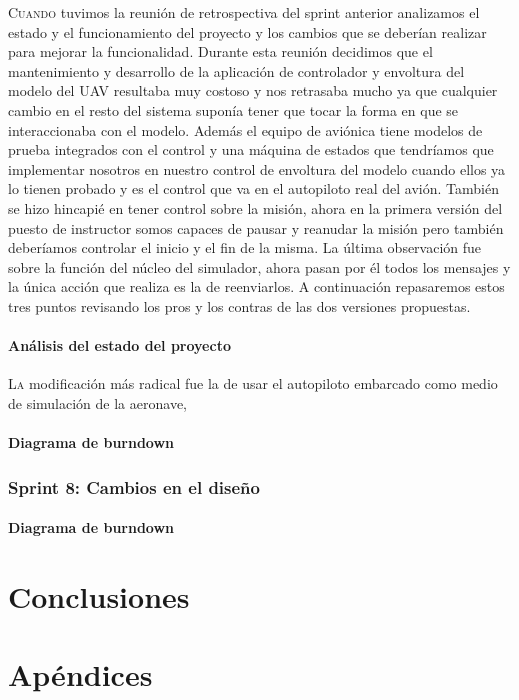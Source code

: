 \documentclass[12pt,a4paper,spanish]{book} %
\newcommand{\imgCentradaGrande}[3]{
\begin{figure}[H]
\begin{center}
\texttt{[image: \#2]}
\caption{#3}
\label{#1}
\end{center}
\end{figure}
}
\begin{document}
\lettrine{C}{uando} tuvimos la reunión de retrospectiva del sprint anterior analizamos el estado y el funcionamiento del proyecto y los cambios que se deberían realizar para mejorar la funcionalidad. Durante esta reunión decidimos que el mantenimiento y desarrollo de la aplicación de controlador y envoltura del modelo del UAV resultaba muy costoso y nos retrasaba mucho ya que cualquier cambio en el resto del sistema suponía tener que tocar la forma en que se interaccionaba con el modelo. Además el equipo de aviónica tiene modelos de prueba integrados con el control y una máquina de estados que tendríamos que implementar nosotros en nuestro control de envoltura del modelo cuando ellos ya lo tienen probado y es el control que va en el autopiloto real del avión. También se hizo hincapié en tener control sobre la misión, ahora en la primera versión del puesto de instructor somos capaces de pausar y reanudar la misión pero también deberíamos controlar el inicio y el fin de la misma. La última observación fue sobre la función del núcleo del simulador, ahora pasan por él todos los mensajes y la única acción que realiza es la de reenviarlos. A continuación repasaremos estos tres puntos revisando los pros y los contras de las dos versiones propuestas.

\subsection{Análisis del estado del proyecto}

\lettrine{L}{a} modificación más radical fue la de usar el autopiloto embarcado como medio de simulación de la aeronave, 

\subsection{Diagrama de burndown}

\newpage
\section{Sprint 8: Cambios en el diseño}

\subsection{Diagrama de burndown}

\part{Conclusiones}

\part{Apéndices}
\end{document}
